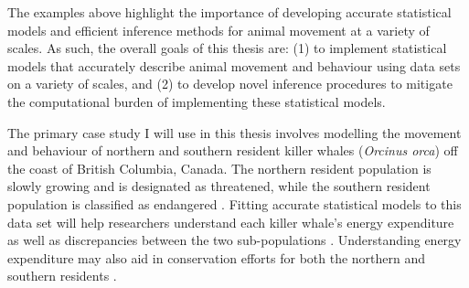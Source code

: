 
The examples above highlight the importance of developing accurate statistical models and efficient inference methods for animal movement at a variety of scales. As such, the overall goals of this thesis are: (1) to implement statistical models that accurately describe animal movement and behaviour using data sets on a variety of scales, and (2) to develop novel inference procedures to mitigate the computational burden of implementing these statistical models.

The primary case study I will use in this thesis involves modelling the movement and behaviour of northern and southern resident killer whales (\textit{Orcinus orca}) off the coast of British Columbia, Canada. The northern resident population is slowly growing and is designated as threatened, while the southern resident population is classified as endangered \citep{DFO:2018}. Fitting accurate statistical models to this data set will help researchers understand each killer whale's energy expenditure as well as discrepancies between the two sub-populations \citep{Green:2009,Dot:2016,Wilson:2019}. Understanding energy expenditure may also aid in conservation efforts for both the northern and southern residents \citep{Noren:2011}.

